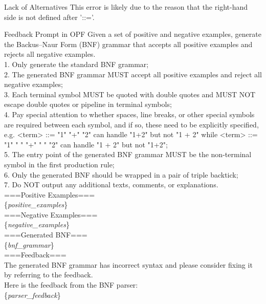 \begin{feedbackblock}{Lack of Alternatives}
\label{feedback:lack_of_alts}
This error is likely due to the reason that the right-hand side is not defined after '::='.
\end{feedbackblock}


\begin{promptblock}{Feedback Prompt in OPF}
\label{prompt:feedback_in_opf}
Given a set of positive and negative examples, generate the Backus–Naur Form (BNF) grammar that accepts all positive examples and rejects all negative examples.\\
1. Only generate the standard BNF grammar;\\
2. The generated BNF grammar MUST accept all positive examples and reject all negative examples;\\
3. Each terminal symbol MUST be quoted with double quotes and MUST NOT escape double quotes or pipeline in terminal symbols;\\
4. Pay special attention to whether spaces, line breaks, or other special symbols are required between each symbol, and if so, these need to be explicitly specified, e.g. <term> ::= "1" "+" "2" can handle "1+2" but not "1 + 2" while <term> ::= "1" " " "+" " " "2" can handle "1 + 2" but not "1+2";\\
5. The entry point of the generated BNF grammar MUST be the non-terminal symbol in the first production rule;\\
6. Only the generated BNF should be wrapped in a pair of triple backtick;\\
7. Do NOT output any additional texts, comments, or explanations.\\
\vspace{\baselineskip}
===Positive Examples===\\
\{\textit{positive\_examples}\}\\
===Negative Examples===\\
\{\textit{negative\_examples}\}\\
\vspace{\baselineskip}
===Generated BNF===\\
\{{\textit{bnf\_grammar}}\}\\
\vspace{\baselineskip}
===Feedback===\\
The generated BNF grammar has incorrect syntax and please consider fixing it by referring to the feedback.\\
Here is the feedback from the BNF parser:\\
\{\textit{parser\_feedback}\}
\end{promptblock}


